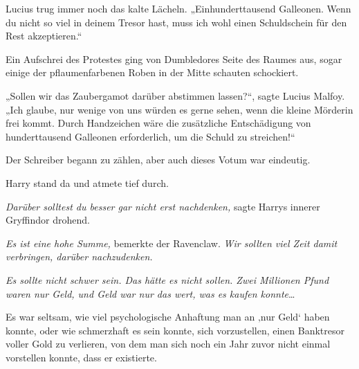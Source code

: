 Lucius trug immer noch das kalte Lächeln.
„Einhunderttausend Galleonen. Wenn du nicht so viel in deinem Tresor hast, muss ich wohl einen Schuldschein für den Rest akzeptieren.“

Ein Aufschrei des Protestes ging von Dumbledores Seite des Raumes aus, sogar einige der pflaumenfarbenen Roben in der Mitte schauten schockiert.

„Sollen wir das Zaubergamot darüber abstimmen lassen?“, sagte Lucius Malfoy.
„Ich glaube, nur wenige von uns würden es gerne sehen, wenn die kleine Mörderin frei kommt. Durch Handzeichen wäre die zusätzliche Entschädigung von hunderttausend Galleonen erforderlich, um die Schuld zu streichen!“

Der Schreiber begann zu zählen, aber auch dieses Votum war eindeutig.

Harry stand da und atmete tief durch.

\emph{Darüber solltest du besser gar nicht erst nachdenken,} sagte Harrys innerer Gryffindor drohend.

\emph{Es ist eine hohe Summe,} bemerkte der Ravenclaw. \emph{Wir sollten viel Zeit damit verbringen, darüber nachzudenken.}

\emph{Es sollte nicht schwer sein. Das hätte es nicht sollen. Zwei Millionen Pfund waren nur Geld, und Geld war nur das wert, was es kaufen konnte}…

Es war seltsam, wie viel psychologische Anhaftung man an ‚nur Geld‘ haben konnte, oder wie schmerzhaft es sein konnte, sich vorzustellen, einen Banktresor voller Gold zu verlieren, von dem man sich noch ein Jahr zuvor nicht einmal vorstellen konnte, dass er existierte.


